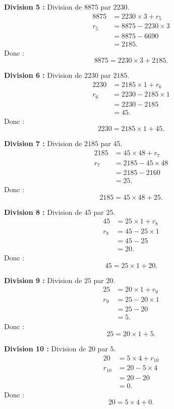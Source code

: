 \documentclass[12pt,a4paper]{article}
\begin{document}
\noindent
\textbf{Division 5 :} Division de $8875$ par $2230$.
\[
\begin{aligned}
8875 &= 2230 \times 3 + r_5 \\
r_5  &= 8875 - 2230 \times 3 \\
     &= 8875 - 6690 \\
     &= 2185.
\end{aligned}
\]
Donc :
\[
\boxed{8875 = 2230 \times 3 + 2185}.
\]

\noindent
\textbf{Division 6 :} Division de $2230$ par $2185$.
\[
\begin{aligned}
2230 &= 2185 \times 1 + r_6 \\
r_6  &= 2230 - 2185 \times 1 \\
     &= 2230 - 2185 \\
     &= 45.
\end{aligned}
\]
Donc :
\[
\boxed{2230 = 2185 \times 1 + 45}.
\]

\noindent
\textbf{Division 7 :} Division de $2185$ par $45$.
\[
\begin{aligned}
2185 &= 45 \times 48 + r_7 \\
r_7  &= 2185 - 45 \times 48 \\
     &= 2185 - 2160 \\
     &= 25.
\end{aligned}
\]
Donc :
\[
\boxed{2185 = 45 \times 48 + 25}.
\]

\noindent
\textbf{Division 8 :} Division de $45$ par $25$.
\[
\begin{aligned}
45   &= 25 \times 1 + r_8 \\
r_8  &= 45 - 25 \times 1 \\
     &= 45 - 25 \\
     &= 20.
\end{aligned}
\]
Donc :
\[
\boxed{45 = 25 \times 1 + 20}.
\]

\noindent
\textbf{Division 9 :} Division de $25$ par $20$.
\[
\begin{aligned}
25   &= 20 \times 1 + r_9 \\
r_9  &= 25 - 20 \times 1 \\
     &= 25 - 20 \\
     &= 5.
\end{aligned}
\]
Donc :
\[
\boxed{25 = 20 \times 1 + 5}.
\]

\noindent
\textbf{Division 10 :} Division de $20$ par $5$.
\[
\begin{aligned}
20   &= 5 \times 4 + r_{10} \\
r_{10} &= 20 - 5 \times 4 \\
       &= 20 - 20 \\
       &= 0.
\end{aligned}
\]
Donc :
\[
\boxed{20 = 5 \times 4 + 0}.
\]
\end{document}
